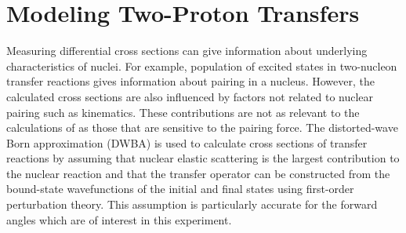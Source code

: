 \section{Modeling Two-Proton Transfers}

Measuring differential cross sections can give information about underlying characteristics of nuclei.  For example, population of excited \zp states in two-nucleon transfer reactions gives information about pairing in a nucleus.  However, the calculated cross sections are also influenced by factors not related to nuclear pairing such as kinematics.  These contributions are not as relevant to the calculations of \NME as those that are sensitive to the pairing force.  The distorted-wave Born approximation (DWBA) is used to calculate cross sections of transfer reactions by assuming that nuclear elastic scattering is the largest contribution to the nuclear reaction and that the transfer operator can be constructed from the bound-state wavefunctions of the initial and final states using first-order perturbation theory.  This assumption is particularly accurate for the forward angles which are of interest in this experiment.

